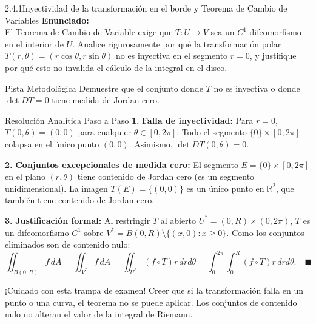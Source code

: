 \documentclass[11pt,a4paper]{article}
\begin{document}
\begin{nivelbox}{2.4.1}{Inyectividad de la transformación en el borde y Teorema de Cambio de Variables}
\textbf{Enunciado:}\\
El Teorema de Cambio de Variable exige que $T: U \to V$ sea un $C^1$-difeomorfismo en el interior de $U$. Analice rigurosamente por qué la transformación polar $T(r,\theta) = (r\cos\theta, r\sin\theta)$ no es inyectiva en el segmento $r = 0$, y justifique por qué esto no invalida el cálculo de la integral en el disco.

\begin{observacionbox}{Pista Metodológica}
Demuestre que el conjunto donde $T$ no es inyectiva o donde $\det DT = 0$ tiene medida de Jordan cero.
\end{observacionbox}

\begin{ejerciciobox}{Resolución Analítica Paso a Paso}
\smallskip\noindent\textbf{1.} \textbf{Falla de inyectividad:}
Para $r = 0$, $T(0, \theta) = (0,0)$ para cualquier $\theta \in [0, 2\pi]$. Todo el segmento $\{0\} \times [0, 2\pi]$ colapsa en el único punto $(0,0)$. Asimismo, $\det DT(0, \theta) = 0$.

\smallskip\noindent\textbf{2.} \textbf{Conjuntos excepcionales de medida cero:}
El segmento $E = \{0\} \times [0, 2\pi]$ en el plano $(r,\theta)$ tiene contenido de Jordan cero (es un segmento unidimensional).
La imagen $T(E) = \{(0,0)\}$ es un único punto en $\mathbb{R}^2$, que también tiene contenido de Jordan cero.

\smallskip\noindent\textbf{3.} \textbf{Justificación formal:}
Al restringir $T$ al abierto $U^* = (0, R) \times (0, 2\pi)$, $T$ es un difeomorfismo $C^1$ sobre $V^* = B(0,R) \setminus \{ (x,0) : x \ge 0 \}$. Como los conjuntos eliminados son de contenido nulo:
\[\iint_{B(0,R)} f \, dA = \iint_{V^*} f \, dA = \iint_{U^*} (f \circ T) r \, dr d\theta = \int_0^{2\pi} \int_0^R (f \circ T) r \, dr d\theta. \quad \blacksquare\]
\end{ejerciciobox}

\begin{errorbox}{¡Cuidado con esta trampa de examen!}
Creer que si la transformación falla en un punto o una curva, el teorema no se puede aplicar. Los conjuntos de contenido nulo no alteran el valor de la integral de Riemann.
\end{errorbox}
\end{nivelbox}
\bigskip
\end{document}
